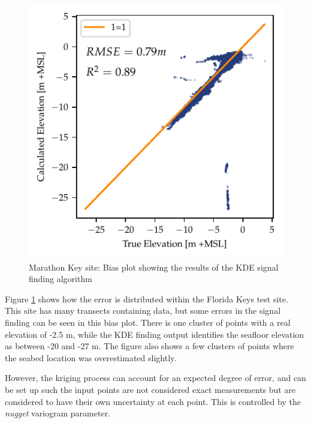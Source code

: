 \begin{figure}[!ht]
    \centering
    \includegraphics{figures/florida_keys_lidar_estimated_vs_truth.pdf}
    \caption{Marathon Key site: Bias plot showing the results of the KDE signal finding algorithm}
    \label{fig:keys-biasplot}
\end{figure}

Figure \ref{fig:keys-biasplot} shows how the error is distributed within the Florida Keys test site. This site has many transects containing data, but some errors in the signal finding can be seen in this bias plot. There is one cluster of points with a real elevation of -2.5 m, while the KDE finding output identifies the seafloor elevation as between -20 and -27 m.  The figure also shows a few clusters of points where the seabed location was overestimated slightly.

However, the kriging process can account for an expected degree of error, and can be set up such the input points are not considered exact measurements but are considered to have their own uncertainty at each point. This is controlled by the \emph{nugget} variogram parameter.

